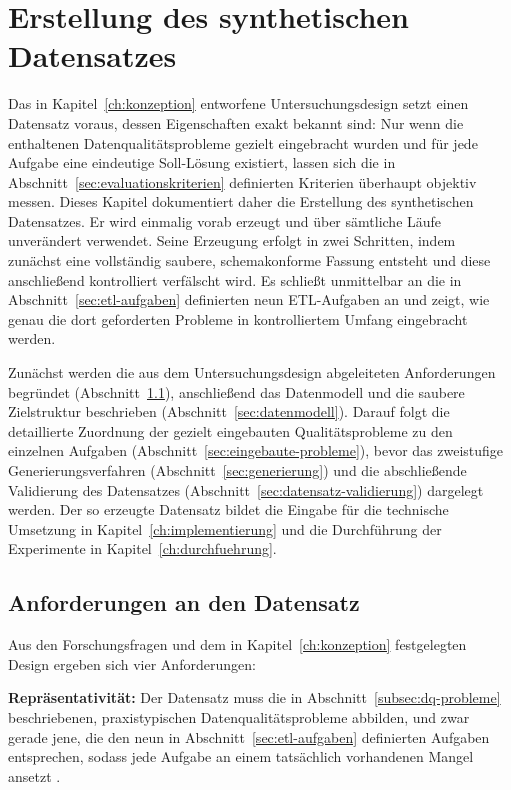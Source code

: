 
\chapter{Erstellung des synthetischen Datensatzes}
\label{ch:datensatz}

Das in Kapitel~\ref{ch:konzeption} entworfene Untersuchungsdesign setzt einen Datensatz voraus, dessen Eigenschaften exakt bekannt sind: Nur wenn die enthaltenen Datenqualitätsprobleme gezielt eingebracht wurden und für jede Aufgabe eine eindeutige Soll-Lösung existiert, lassen sich die in Abschnitt~\ref{sec:evaluationskriterien} definierten Kriterien überhaupt objektiv messen. Dieses Kapitel dokumentiert daher die Erstellung des synthetischen Datensatzes. Er wird einmalig vorab erzeugt und über sämtliche Läufe unverändert verwendet. Seine Erzeugung erfolgt in zwei Schritten, indem zunächst eine vollständig saubere, schemakonforme Fassung entsteht und diese anschließend kontrolliert verfälscht wird. Es schließt unmittelbar an die in Abschnitt~\ref{sec:etl-aufgaben} definierten neun \ac{ETL}-Aufgaben an und zeigt, wie genau die dort geforderten Probleme in kontrolliertem Umfang eingebracht werden.

Zunächst werden die aus dem Untersuchungsdesign abgeleiteten Anforderungen begründet (Abschnitt~\ref{sec:datensatz-anforderungen}), anschließend das Datenmodell und die saubere Zielstruktur beschrieben (Abschnitt~\ref{sec:datenmodell}). Darauf folgt die detaillierte Zuordnung der gezielt eingebauten Qualitätsprobleme zu den einzelnen Aufgaben (Abschnitt~\ref{sec:eingebaute-probleme}), bevor das zweistufige Generierungsverfahren (Abschnitt~\ref{sec:generierung}) und die abschließende Validierung des Datensatzes (Abschnitt~\ref{sec:datensatz-validierung}) dargelegt werden. Der so erzeugte Datensatz bildet die Eingabe für die technische Umsetzung in Kapitel~\ref{ch:implementierung} und die Durchführung der Experimente in Kapitel~\ref{ch:durchfuehrung}.

\section{Anforderungen an den Datensatz}
\label{sec:datensatz-anforderungen}

Aus den Forschungsfragen und dem in Kapitel~\ref{ch:konzeption} festgelegten Design ergeben sich vier Anforderungen:

\noindent\textbf{Repräsentativität:} Der Datensatz muss die in Abschnitt~\ref{subsec:dq-probleme} beschriebenen, praxistypischen Datenqualitätsprobleme abbilden, und zwar gerade jene, die den neun in Abschnitt~\ref{sec:etl-aufgaben} definierten Aufgaben entsprechen, sodass jede Aufgabe an einem tatsächlich vorhandenen Mangel ansetzt \autocite{ridzuanReviewDataQuality2024,coteDataCleaningMachine2024}.

